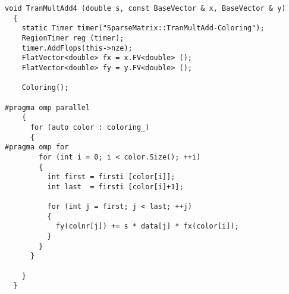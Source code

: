 \documentclass[a4paper,11pt]{scrartcl}
\begin{document}
\begin{lstlisting}
void TranMultAdd4 (double s, const BaseVector & x, BaseVector & y)
  {
    static Timer timer("SparseMatrix::TranMultAdd-Coloring");
    RegionTimer reg (timer);
    timer.AddFlops(this->nze);
    FlatVector<double> fx = x.FV<double> ();
    FlatVector<double> fy = y.FV<double> ();

    Coloring();

#pragma omp parallel
    {
      for (auto color : coloring_)
      {
#pragma omp for
        for (int i = 0; i < color.Size(); ++i)
        {
          int first = firsti [color[i]];
          int last  = firsti [color[i]+1];

          for (int j = first; j < last; ++j)
          {
            fy(colnr[j]) += s * data[j] * fx(color[i]);
          }
        }
      }

    }
  }


\end{lstlisting}
\end{document}
